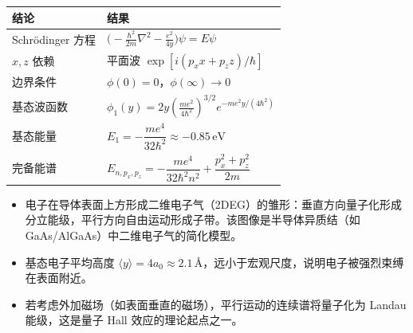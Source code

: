 \begin{formulabox}[答案汇总]
\begin{center}
\begin{tabular}{ll}
\toprule
\textbf{结论} & \textbf{结果} \\
\midrule
Schrödinger 方程 & $\bigl(-\frac{\hbar^2}{2m}\nabla^2-\frac{e^2}{4y}\bigr)\psi=E\psi$ \\
$x,z$ 依赖 & 平面波 $\exp[i(p_xx+p_zz)/\hbar]$ \\
边界条件 & $\phi(0)=0$，$\phi(\infty)\to0$ \\
基态波函数 & $\phi_1(y)=2y\left(\frac{me^2}{4\hbar^2}\right)^{3/2}e^{-me^2y/(4\hbar^2)}$ \\
基态能量 & $E_1=-\dfrac{me^4}{32\hbar^2}\approx-0.85\,\text{eV}$ \\
完备能谱 & $E_{n,p_x,p_z}=-\dfrac{me^4}{32\hbar^2n^2}+\dfrac{p_x^2+p_z^2}{2m}$ \\
\bottomrule
\end{tabular}
\end{center}
\end{formulabox}

\begin{insightbox}[物理图像]
\begin{itemize}
    \item 电子在导体表面上方形成二维电子气（2DEG）的雏形：垂直方向量子化形成分立能级，平行方向自由运动形成子带。该图像是半导体异质结（如 GaAs/AlGaAs）中二维电子气的简化模型。
    \item 基态电子平均高度 $\langle y\rangle=4a_0\approx2.1\,\text{Å}$，远小于宏观尺度，说明电子被强烈束缚在表面附近。
    \item 若考虑外加磁场（如表面垂直的磁场），平行运动的连续谱将量子化为 Landau 能级，这是量子 Hall 效应的理论起点之一。
\end{itemize}
\end{insightbox}
